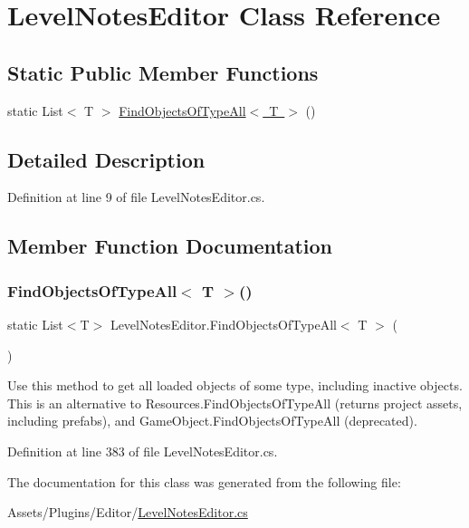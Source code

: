 \hypertarget{class_level_notes_editor}{}\section{Level\+Notes\+Editor Class Reference}
\label{class_level_notes_editor}
\subsection*{Static Public Member Functions}
\begin{DoxyCompactItemize}
\item 
static List$<$ T $>$ \mbox{\hyperlink{class_level_notes_editor_a5a0783f16a071dc8598262aa6f579600}{Find\+Objects\+Of\+Type\+All$<$ T $>$}} ()
\end{DoxyCompactItemize}


\subsection{Detailed Description}


Definition at line 9 of file Level\+Notes\+Editor.\+cs.



\subsection{Member Function Documentation}
\mbox{\label{class_level_notes_editor_a5a0783f16a071dc8598262aa6f579600}} 
\subsubsection{\texorpdfstring{Find\+Objects\+Of\+Type\+All$<$ T $>$()}{FindObjectsOfTypeAll< T >()}}
{\footnotesize\ttfamily static List$<$T$>$ Level\+Notes\+Editor.\+Find\+Objects\+Of\+Type\+All$<$ T $>$ (\begin{DoxyParamCaption}{ }\end{DoxyParamCaption})\hspace{0.3cm}{\ttfamily [static]}}

Use this method to get all loaded objects of some type, including inactive objects. This is an alternative to Resources.\+Find\+Objects\+Of\+Type\+All (returns project assets, including prefabs), and Game\+Object.\+Find\+Objects\+Of\+Type\+All (deprecated). 

Definition at line 383 of file Level\+Notes\+Editor.\+cs.



The documentation for this class was generated from the following file\+:\begin{DoxyCompactItemize}
\item 
Assets/\+Plugins/\+Editor/\mbox{\hyperlink{_level_notes_editor_8cs}{Level\+Notes\+Editor.\+cs}}\end{DoxyCompactItemize}
